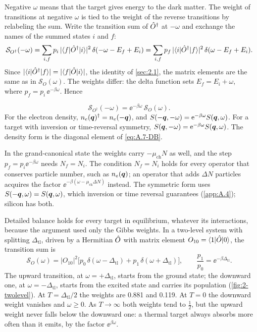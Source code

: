 Negative $\omega$ means that the target gives energy to the dark matter. The weight of transitions at negative $\omega$ is tied to the weight of the reverse transitions by relabeling the sum. Write the transition sum of $\hat{O}^\dagger$ at $-\omega$ and exchange the names of the summed states $i$ and $f$:
\begin{equation*}
  \mathcal{S}_{O^\dagger}(-\omega) = \sum_{i,f}p_i\,|\langle f|\hat{O}^\dagger|i\rangle|^2\,\delta(-\omega - E_f + E_i)
  = \sum_{i,f}p_f\,|\langle i|\hat{O}^\dagger|f\rangle|^2\,\delta(\omega - E_f + E_i) .
\end{equation*}
Since $|\langle i|\hat{O}^\dagger|f\rangle| = |\langle f|\hat{O}|i\rangle|$, the identity of \cref{sec:2.1}, the matrix elements are the same as in $\mathcal{S}_O(\omega)$. The weights differ: the delta function sets $E_f = E_i + \omega$, where $p_f = p_i\,\ee^{-\beta\omega}$. Hence
\begin{keyresult}
\begin{equation}
  \mathcal{S}_{O^\dagger}(-\omega) = \ee^{-\beta\omega}\,\mathcal{S}_O(\omega) .
  \label{eq:2.5-db}
\end{equation}
For the electron density, $n_e(\bm{q})^\dagger = n_e(-\bm{q})$, and $S(-\bm{q},-\omega) = \mathrm{e}^{-\beta\omega}S(\bm{q},\omega)$. For a target with inversion or time-reversal symmetry, $S(\bm{q},-\omega) = \mathrm{e}^{-\beta\omega}S(\bm{q},\omega)$. The density form is the diagonal element of \cref{eq:A.7-DB}.
\end{keyresult}
In the grand-canonical state the weights carry $-\mu_{\mathrm{ch}}N$ as well, and the step $p_f = p_i\ee^{-\beta\omega}$ needs $N_f = N_i$. The condition $N_f = N_i$ holds for every operator that conserves particle number, such as $n_e(\bm{q})$; an operator that adds $\Delta N$ particles acquires the factor $\ee^{-\beta(\omega - \mu_{\mathrm{ch}}\Delta N)}$ instead. The symmetric form uses $S(-\bm{q},\omega) = S(\bm{q},\omega)$, which inversion or time reversal guarantees (\cref{app:A.4}); silicon has both.

Detailed balance holds for every target in equilibrium, whatever its interactions, because the argument used only the Gibbs weights. In a two-level system with splitting $\Delta_{\mathrm{tl}}$, driven by a Hermitian $\hat{O}$ with matrix element $O_{10} = \langle 1|\hat{O}|0\rangle$, the transition sum is
\begin{equation*}
  \mathcal{S}_O(\omega) = |O_{10}|^2\bigl[p_0\,\delta(\omega - \Delta_{\mathrm{tl}}) + p_1\,\delta(\omega + \Delta_{\mathrm{tl}})\bigr], \qquad \frac{p_1}{p_0} = \ee^{-\beta\Delta_{\mathrm{tl}}} .
\end{equation*}
The upward transition, at $\omega = +\Delta_{\mathrm{tl}}$, starts from the ground state; the downward one, at $\omega = -\Delta_{\mathrm{tl}}$, starts from the excited state and carries its population (\cref{fig:2-twolevel}). At $T = \Delta_{\mathrm{tl}}/2$ the weights are 0.881 and 0.119. At $T = 0$ the downward weight vanishes and $\omega \ge 0$. As $T \to \infty$ both weights tend to $\tfrac12$, but the upward weight never falls below the downward one: a thermal target always absorbs more often than it emits, by the factor $\ee^{\beta\omega}$.

